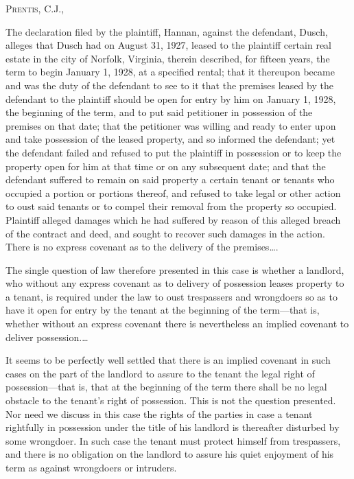 

\textsc{Prentis}, C.J.,

The declaration filed by the plaintiff, Hannan, against the defendant, Dusch,
alleges that Dusch had on August 31, 1927, leased to the plaintiff certain real
estate in the city of Norfolk, Virginia, therein described, for fifteen years,
the term to begin January 1, 1928, at a specified rental; that it thereupon
became and was the duty of the defendant to see to it that the premises leased
by the defendant to the plaintiff should be open for entry by him on January 1,
1928, the beginning of the term, and to put said petitioner in possession of
the premises on that date; that the petitioner was willing and ready to enter
upon and take possession of the leased property, and so informed the defendant;
yet the defendant failed and refused to put the plaintiff in possession or to
keep the property open for him at that time or on any subsequent date; and that
the defendant suffered to remain on said property a certain tenant or tenants
who occupied a portion or portions thereof, and refused to take legal or other
action to oust said tenants  or to compel their removal from the property so
occupied. Plaintiff alleged damages which he had suffered by reason of this
alleged breach of the contract and deed, and sought to recover such damages in
the action. There is no express covenant as to the delivery of the
premises\ldots.

The single question of law therefore presented in this case is whether a
landlord, who without any express covenant as to delivery of possession leases
property to a tenant, is required under the law to oust trespassers and
wrongdoers so as to have it open for entry by the tenant at the beginning of
the term---that is, whether without an express covenant there is nevertheless
an implied covenant to deliver possession.\ldots

It seems to be perfectly well settled that there is an implied covenant in such
cases on the part of the landlord to assure to the tenant the legal right of
possession---that is, that at the beginning of the term there shall be no
legal obstacle to the tenant's right of possession. This is not the question
presented. Nor need we discuss in this case the rights of the parties in case a
tenant rightfully in possession under the title of his landlord is thereafter
disturbed by some wrongdoer. In such case the tenant must protect himself from
trespassers, and there is no obligation on the landlord to assure his quiet
enjoyment of his term as against wrongdoers or intruders.

